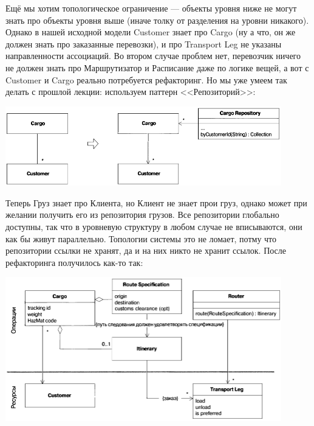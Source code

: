 \documentclass{../../text-style}
\begin{document}
Ещё мы хотим топологическое ограничение --- объекты уровня ниже не могут знать про объекты уровня выше (иначе толку от разделения на уровни никакого). Однако в нашей исходной модели Customer знает про Cargo (ну а что, он же должен знать про заказанные перевозки), и про Transport Leg не указаны направленности ассоциаций. Во втором случае проблем нет, перевозчик ничего не должен знать про Маршрутизатор и Расписание даже по логике вещей, а вот с Customer и Cargo реально потребуется рефакторинг. Но мы уже умеем так делать с прошлой лекции: используем паттерн <<Репозиторий>>: 

\begin{center}
    \includegraphics[width=0.9\textwidth]{cargoTwoLayersRefactoring.png}
\end{center}

Теперь Груз знает про Клиента, но Клиент не знает прои груз, однако может при желании получить его из репозитория грузов. Все репозитории глобально доступны, так что в уровневую структуру в любом случае не вписываются, они как бы живут параллельно. Топологии системы это не ломает, потму что репозитории ссылки не хранят, да и на них никто не хранит ссылок. После рефакторинга получилось как-то так:

\begin{center}
    \includegraphics[width=0.9\textwidth]{cargoTwoLayers.png}
\end{center}
\end{document}

